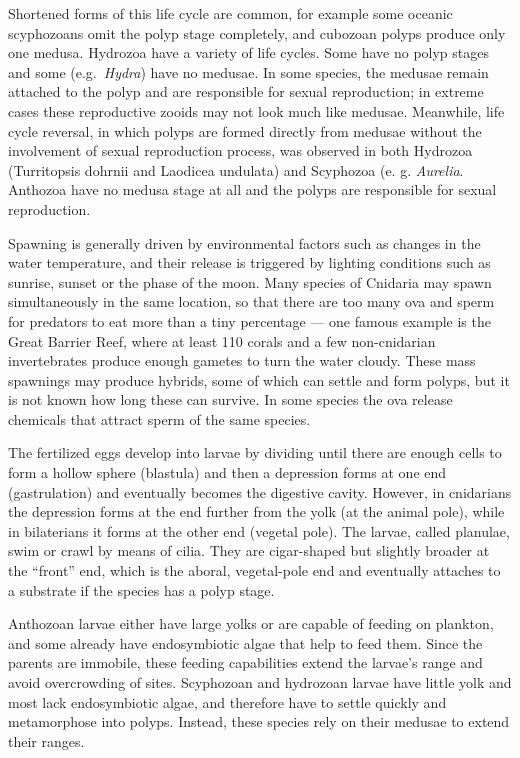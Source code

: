 \documentclass[]{book}
\theoremstyle{definition}
\theoremstyle{definition}
\theoremstyle{definition}
\theoremstyle{remark}
\begin{document}
Shortened forms of this life cycle are common, for example some oceanic
scyphozoans omit the polyp stage completely, and cubozoan polyps produce
only one medusa. Hydrozoa have a variety of life cycles. Some have no
polyp stages and some (e.g.~\emph{Hydra}) have no medusae. In some species, the
medusae remain attached to the polyp and are responsible for sexual
reproduction; in extreme cases these reproductive zooids may not look
much like medusae. Meanwhile, life cycle reversal, in which polyps are
formed directly from medusae without the involvement of sexual
reproduction process, was observed in both Hydrozoa (Turritopsis dohrnii
and Laodicea undulata) and Scyphozoa (e. g. \emph{Aurelia}. Anthozoa have
no medusa stage at all and the polyps are responsible for sexual
reproduction.

Spawning is generally driven by environmental factors such as changes in
the water temperature, and their release is triggered by lighting
conditions such as sunrise, sunset or the phase of the moon. Many
species of Cnidaria may spawn simultaneously in the same location, so
that there are too many ova and sperm for predators to eat more than a
tiny percentage --- one famous example is the Great Barrier Reef, where
at least 110 corals and a few non-cnidarian invertebrates produce enough
gametes to turn the water cloudy. These mass spawnings may produce
hybrids, some of which can settle and form polyps, but it is not known
how long these can survive. In some species the ova release chemicals
that attract sperm of the same species.

The fertilized eggs develop into larvae by dividing until there are
enough cells to form a hollow sphere (blastula) and then a depression
forms at one end (gastrulation) and eventually becomes the digestive
cavity. However, in cnidarians the depression forms at the end further
from the yolk (at the animal pole), while in bilaterians it forms at the
other end (vegetal pole). The larvae, called planulae, swim or crawl by
means of cilia. They are cigar-shaped but slightly broader at the
``front'' end, which is the aboral, vegetal-pole end and eventually
attaches to a substrate if the species has a polyp stage.

Anthozoan larvae either have large yolks or are capable of feeding on
plankton, and some already have endosymbiotic algae that help to feed
them. Since the parents are immobile, these feeding capabilities extend
the larvae's range and avoid overcrowding of sites. Scyphozoan and
hydrozoan larvae have little yolk and most lack endosymbiotic algae, and
therefore have to settle quickly and metamorphose into polyps. Instead,
these species rely on their medusae to extend their ranges.
\end{document}
